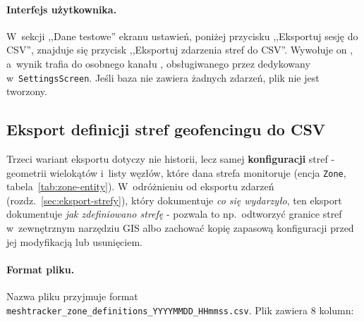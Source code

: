 \paragraph{Interfejs użytkownika.}

W~sekcji ,,Dane testowe'' ekranu ustawień, poniżej przycisku ,,Eksportuj sesję do CSV'',
znajduje się przycisk ,,Eksportuj zdarzenia stref do CSV''. Wywołuje on
\texttt{}, a~wynik trafia do osobnego kanału
\texttt{}, obsługiwanego przez dedykowany \texttt{}
w~\texttt{SettingsScreen}. Jeśli baza nie zawiera żadnych zdarzeń, plik nie jest tworzony.

\subsection*{Eksport definicji stref geofencingu do CSV}
\label{sec:eksport-definicje-stref}

Trzeci wariant eksportu dotyczy nie historii, lecz samej \textbf{konfiguracji} stref -
geometrii wielokątów i~listy węzłów, które dana strefa monitoruje (encja \texttt{Zone},
tabela~\ref{tab:zone-entity}). W~odróżnieniu od eksportu zdarzeń (rozdz.~\ref{sec:eksport-strefy}),
który dokumentuje \emph{co się wydarzyło}, ten eksport dokumentuje \emph{jak zdefiniowano
strefę} - pozwala to np.\ odtworzyć granice stref w~zewnętrznym narzędziu GIS albo zachować
kopię zapasową konfiguracji przed jej modyfikacją lub usunięciem.

\paragraph{Format pliku.}

Nazwa pliku przyjmuje format\\
\texttt{meshtracker\_zone\_definitions\_YYYYMMDD\_HHmmss.csv}.
Plik zawiera 8 kolumn:


